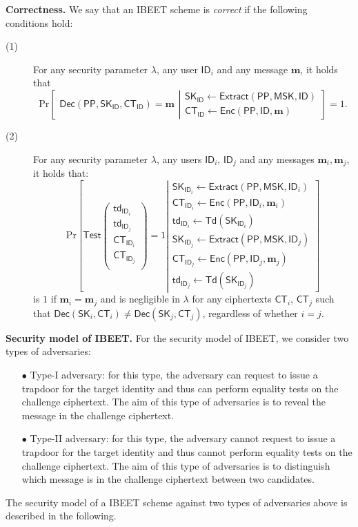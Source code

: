 \documentclass[runningheads]{llncs}
\def\bf{\mathbf}
\def\SK{\mathsf{SK}}
\def\PP{\mathsf{PP}}
\def\MSK{\mathsf{MSK}}
\def\CT{\mathsf{CT}}
\def\td{\mathsf{td}}
\def\Enc{\mathsf{Enc}}
\def\Extract{\mathsf{Extract}}
\def\Dec{\mathsf{Dec}}
\def\Td{\mathsf{Td}}
\def\Test{\mathsf{Test}}
\def\Pr{\mathrm{Pr}}
\def\ID{\mathsf{ID}}
\begin{document}
	\noindent\textbf{Correctness.} We say that an IBEET scheme is \textit{correct} if the following conditions hold:
	\begin{description}
		\item[(1)] For any security parameter $\lambda$, any user $\ID_i$ and any message $\bf{m}$, it holds that
		$$\Pr\left[ {\begin{gathered}
			\Dec(\PP,\SK_{\ID},\CT_{\ID})=\bf{m}\end{gathered}  
			\left| \begin{gathered}
			\SK_{\ID}\gets\Extract(\PP,\MSK,\ID)\\
			\CT_{\ID}\gets\Enc(\PP,\ID,\bf{m})
			\end{gathered}  \right.} \right]=1.$$
		\item[(2)] For any security parameter $\lambda$, any users $\ID_i$, $\ID_j$ and any messages $\bf{m}_i, \bf{m}_j$, it holds that:    
		$$\Pr\left[{
			\Test\left( \begin{gathered}
			\td_{\ID_i} \\
			\td_{\ID_j} \\
			\CT_{\ID_i} \\
			\CT_{\ID_j} \\ 
			\end{gathered}  \right) = 1\left| \begin{array}{l}
			\SK_{\ID_i}\gets\Extract(\PP,\MSK,\ID_i) \\
			\CT_{\ID_i}\gets\Enc(\PP,\ID_i,\bf{m}_i) \\
			\td_{\ID_i}\gets\Td(\SK_{\ID_i}) \\
			\SK_{\ID_j}\gets\Extract(\PP,\MSK,\ID_j) \\
			\CT_{\ID_j}\gets\Enc(\PP,\ID_j,\bf{m}_j) \\
			\td_{\ID_j}\gets\Td(\SK_{\ID_j}) 
			\end{array}  \right.} \right]$$
	is  $1$	if $\bf{m}_i=\bf{m}_j$ and 
		is negligible in $\lambda$ for any ciphertexts $\CT_i$, $\CT_j$ such that $\Dec(\SK_i,\CT_i)\ne\Dec(\SK_j,\CT_j)$, regardless of whether $i=j$.
	\end{description}
	
	\noindent\textbf{Security model of IBEET.} For the security model of IBEET, we consider two types of adversaries:
	\begin{itemize}
		\item[$\bullet$] Type-I adversary: for this type, the adversary can request to issue a trapdoor for the target identity and thus can perform equality tests on the challenge ciphertext. The aim of this type of adversaries is to reveal the message in the challenge ciphertext.
		\item[$\bullet$] Type-II adversary: for this type, the adversary cannot request to issue a trapdoor for the target identity and thus cannot perform equality tests on the challenge ciphertext. The aim of this type of adversaries is to distinguish which message is in the challenge ciphertext between two candidates.
	\end{itemize}
	The security model of a IBEET scheme against two types of adversaries above is described in the following.\\
	
\end{document}

